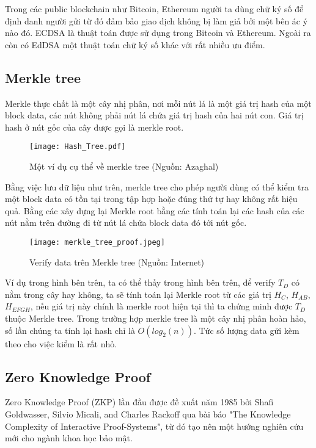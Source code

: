 \documentclass[../thesis.tex]{subfiles}
\begin{document}
Trong các public blockchain như Bitcoin, Ethereum người ta dùng chữ ký số để định danh người gửi từ đó đảm bảo giao dịch không bị làm giả bởi một bên ác ý nào đó. ECDSA \cite{ECDSA} là thuật toán được sử dụng trong Bitcoin và Ethereum. Ngoài ra còn có EdDSA \cite{EdDSA} một thuật toán chữ ký số khác với rất nhiều ưu điểm.

\subsection{Merkle tree}

Merkle thực chất là một cây nhị phân, nơi mỗi nút lá là một giá trị hash của một block data, các nút không phải nút lá chứa giá trị hash của hai nút con. Giá trị hash ở nút gốc của cây được gọi là merkle root. 

\begin{figure}[H]
   \centering
   \texttt{[image: Hash\_Tree.pdf]}
   \caption{Một ví dụ cụ thể về merkle tree (Nguồn: Azaghal)}
\end{figure}

Bằng việc lưu dữ liệu như trên, merkle tree cho phép người dùng có thể kiểm tra một block data có tồn tại trong tập hợp hoặc đúng thứ tự hay không rất hiệu quả. Bằng các xây dựng lại Merkle root bằng các tính toán lại các hash của các nút nằm trên đường đi từ nút lá chứa block data đó tới nút gốc.
\begin{figure}[H]
   \centering
   \texttt{[image: merkle\_tree\_proof.jpeg]}
   \caption{Verify data trên Merkle tree (Nguồn: Internet)}
\end{figure}

Ví dụ trong hình bên trên, ta có thể thấy trong hình bên trên, để verify $T_{D}$ có nằm trong cây hay không, ta sẽ tính toán lại Merkle root từ các giá trị $H_{C}$, $H_{AB}$, $H_{EFGH}$, nếu giá trị này chính là merkle root hiện tại thì ta chứng minh được $T_{D}$ thuộc Merkle tree. Trong trường hợp merkle tree là một cây nhị phân hoàn hảo, số lần chúng ta tính lại hash chỉ là $O(log_{2}(n))$. Tức số lượng data gửi kèm theo cho việc kiểm là rất nhỏ. 

\subsection{Zero Knowledge Proof}
Zero Knowledge Proof (ZKP) lần đầu được đề xuất năm 1985 bởi Shafi Goldwasser, Silvio Micali, and Charles Rackoff qua bài báo "The Knowledge Complexity of Interactive Proof-Systems", từ đó tạo nên một hướng nghiên cứu mới cho ngành khoa học bảo mật.
\end{document}
